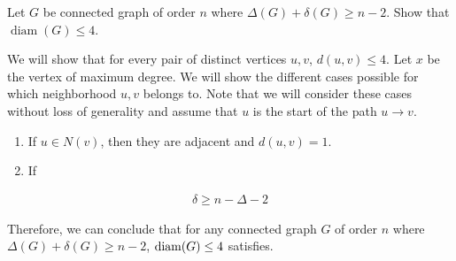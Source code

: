 \question Let \(G\) be connected graph of order \(n\) where
\(\Delta(G)+\delta(G) \geq n-2\). Show that \(\operatorname{diam}
(G) \leq 4\).

\begin{solution}
  We will show that for every pair of distinct vertices \(u, v\),
  \(d(u, v) \leq 4\). Let \(x\) be the vertex of maximum degree.
  We will show the different cases possible for which 
  neighborhood \(u, v\) belongs to. Note that we will consider
  these cases without loss of generality and assume that \(u\) is
  the start of the path \(u \to v\).

  \begin{enumerate}[label=\Roman*.]
    \item If \(u \in N(v)\), then they are adjacent and
      \(d(u, v) = 1\).
    \item If 
  \end{enumerate}

  \[
  \begin{aligned}
    \delta \geq n - \Delta - 2
  \end{aligned}
  \]

  Therefore, we can conclude that for any connected graph \(G\)
  of order \(n\) where \(\Delta(G) + \delta(G) \geq n-2\),
  \(\operatorname{diam}(G) \leq 4\) satisfies. 
\end{solution}
